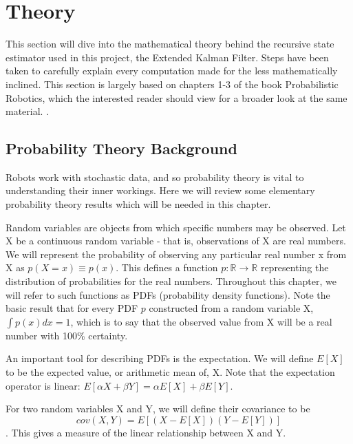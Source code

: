 \newcommand{\bel}{\mathrm{bel}}

\chapter{Theory}

This section will dive into the mathematical theory behind the recursive state estimator used in this project, the Extended Kalman Filter. Steps have been taken to carefully explain every computation made for the less mathematically inclined. This section is largely based on chapters 1-3 of the book Probabilistic Robotics, which the interested reader should view for a broader look at the same material. \cite{probabilisticRobotics}.

\section{Probability Theory Background} \label{sectionProbTheory}
Robots work with stochastic data, and so probability theory is vital to understanding their inner workings. Here we will review some elementary probability theory results which will be needed in this chapter.

Random variables are objects from which specific numbers may be observed. Let X be a continuous random variable - that is, observations of X are real numbers. We will represent the probability of observing any particular real number x from X as \( p(X = x) \equiv p(x)\). This defines a function \(p: \mathbb{R} \to \mathbb{R}\) representing the distribution of probabilities for the real numbers. Throughout this chapter, we will refer to such functions as PDFs (probability density functions). Note the basic result that for every PDF \(p\) constructed from a random variable X, \(\int p(x)dx = 1\), which is to say that the observed value from X will be a real number with 100\% certainty.

An important tool for describing PDFs is the expectation. We will define \(E[X]\) to be the expected value, or arithmetic mean of, X. Note that the expectation operator is linear: \(E[\alpha X + \beta Y] = \alpha E[X] + \beta E[Y]\).

For two random variables X and Y, we will define their covariance to be
\[
cov(X,Y) = E[(X - E[X])(Y - E[Y])]
\]. This gives a measure of the linear relationship between X and Y.

